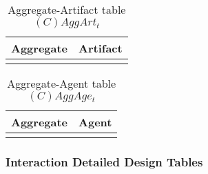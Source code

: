 \begin{table}[H]
	\centering
	\begin{tabular}{|p{4cm}|p{8cm}|}
			\hline
			\textbf{Aggregate} & \textbf{Artifact} \\
			\hline
			& \\
			\hline
		\end{tabular}
	\caption{Aggregate-Artifact table $(C)AggArt_t$}
	\label{tab:caggartt}
\end{table}

\begin{table}[H]
	\centering
	\begin{tabular}{|p{4cm}|p{8cm}|}
			\hline
			\textbf{Aggregate} & \textbf{Agent} \\
			\hline
			& \\
			\hline
		\end{tabular}
	\caption{Aggregate-Agent table $(C)AggAge_t$}
	\label{tab:caggaget}
\end{table}

\subsubsection{Interaction Detailed Design Tables}


